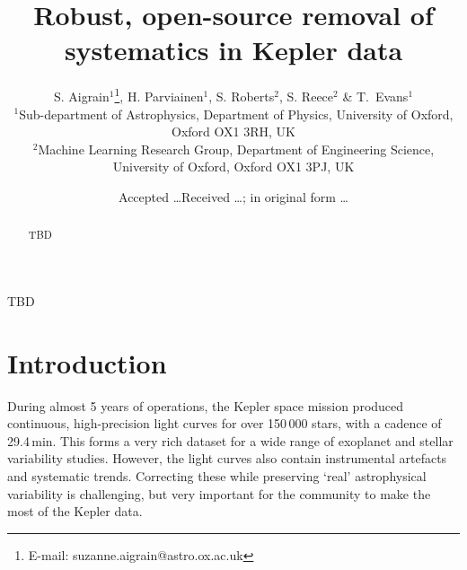 \documentclass[useAMS,usenatbib]{mn2e}
\title{Robust, open-source removal of systematics in Kepler data}
\author[S. Aigrain et al.]{S. Aigrain$^{1}$\thanks{E-mail:
    suzanne.aigrain@astro.ox.ac.uk}, H. Parviainen$^{1}$,
  S. Roberts$^{2}$, S. Reece$^{2}$ \& 
  T.\ Evans$^{1}$ \\
  $^{1}$Sub-department of Astrophysics, Department of Physics,
  University of Oxford, Oxford OX1 3RH, UK\\
  $^{2}$Machine Learning Research Group, Department of
  Engineering Science, University of Oxford, Oxford OX1 3PJ, UK}
\begin{document}
\date{Accepted \ldots Received \ldots; in original form \ldots}

\pagerange{\pageref{firstpage}--\pageref{lastpage}} 

\maketitle

\label{firstpage}

\begin{abstract}
TBD
\end{abstract}

\begin{keywords}
TBD
\end{keywords}

\section{Introduction}

During almost 5 years of operations, the Kepler space mission produced
continuous, high-precision light curves for over 150\,000 stars, with
a cadence of 29.4\,min. This forms a very rich dataset for a wide
range of exoplanet and stellar variability studies. However, the light curves also
contain instrumental artefacts and systematic trends. Correcting these while
preserving `real' astrophysical variability is challenging, but very
important for the community to make the most of the Kepler
data. 
\end{document}
